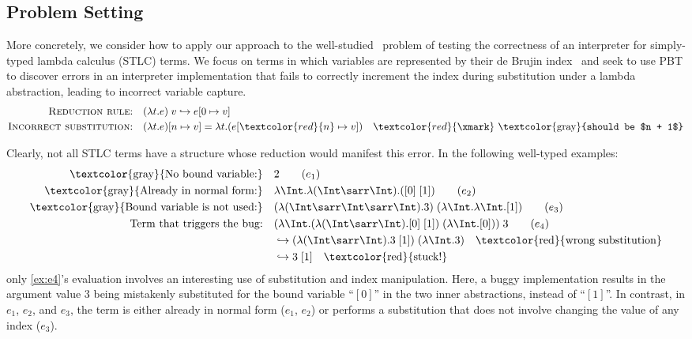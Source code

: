 \subsection{Problem Setting}

More concretely, we consider how to apply our approach to the
well-studied~\cite{BeginnerLuck,CoverageType,FQL24} problem of testing
the correctness of an interpreter for simply-typed lambda calculus
(STLC) terms.  We focus on terms in which variables are represented by
their de Brujin index~\cite{DeBruijn} and seek to use PBT to discover
errors in an interpreter implementation that fails to correctly
increment the index during substitution under a lambda abstraction,
leading to incorrect variable capture.
\begin{align*}
  \text{\textsc{Reduction rule}:} \quad & (\lambda t. e)\; v \hookrightarrow e [0 \mapsto v]\\
  \text{\textsc{Incorrect substitution}:} \quad & (\lambda t. e)[n \mapsto v] = \lambda t. (e[\textcolor{red}{n} \mapsto v]) \quad \textcolor{red}{\xmark} \text{ \textcolor{gray}{should be $n + 1$}}
\end{align*}\noindent

Clearly, not all STLC terms have a structure whose reduction would
manifest this error.  In the following well-typed examples:
\begin{align*}
  \text{\textcolor{gray}{No bound variable:}} \quad & 2 \label{ex:e1}\tag{$e_1$}\\
  \text{\textcolor{gray}{Already in normal form:}} \quad & \lambda \Int. \lambda (\Int\sarr\Int).  ([0]\;[1]) \label{ex:e2}\tag{$e_2$}\\
  \text{\textcolor{gray}{Bound variable is not used:}} \quad & (\lambda (\Int\sarr\Int\sarr\Int). 3)\; (\lambda \Int. \lambda \Int. [1]) \label{ex:e3}\tag{$e_3$}\\
  \text{Term that triggers the bug:} \quad & (\lambda \Int. (\lambda (\Int\sarr\Int). [0]\;[1])\; (\lambda \Int. [0]))\; 3 \label{ex:e4}\tag{$e_4$}\\
  &\hookrightarrow (\lambda (\Int\sarr\Int). 3\;[1])\; (\lambda \Int. 3)  \quad \text{\textcolor{red}{wrong substitution}} \\
  &\hookrightarrow  3\;[1] \quad \text{\textcolor{red}{stuck!}}
\end{align*}\noindent
only \ref{ex:e4}'s evaluation involves an interesting use of
substitution and index manipulation.  Here, a buggy implementation
results in the argument value $3$ being mistakenly substituted for the
bound variable ``$[0]$'' in the two inner abstractions, instead of
``$[1]$''. In contrast, in $e_1$, $e_2$, and $e_3$,
the term is either already in normal form ($e_1$, $e_2$)
or performs a substitution that does not involve changing the value of
any index ($e_3$).

